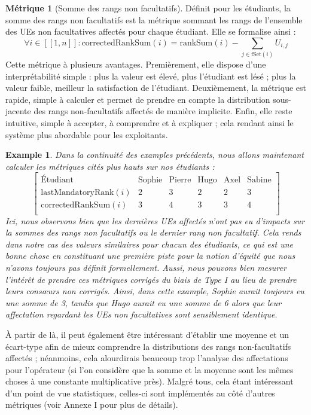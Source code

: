 \documentclass{rapport}
\theoremstyle{definition}
\theoremstyle{remark}
\theoremstyle{plain}
\newtheorem{example}{Example}
\theoremstyle{definition}
\newtheorem*{metric}{Métrique}
\theoremstyle{remark}
\newcommand{\llbracket}{[\![}
\newcommand{\rrbracket}{]\!]}
\begin{document}
\begin{metric}[Somme des rangs non facultatifs]
    Définit pour les étudiants, la somme des rangs non facultatifs est la métrique sommant les rangs de l'ensemble des UEs non facultatives affectés pour chaque étudiant. 
    Elle se formalise ainsi :
    $$
        \forall i\in\llbracket 1, n\rrbracket : \text{correctedRankSum}(i) = \text{rankSum}(i)-\sum_{j\in\text{fSet}(i)} U_{i,j}
    $$
    Cette métrique à plusieurs avantages.
    Premièrement, elle dispose d'une interprétabilité simple : plus la valeur est élevé, plus l'étudiant est lésé ; plus la valeur faible, meilleur la satisfaction de l'étudiant. 
    Deuxièmement, la métrique est rapide, simple à calculer et permet de prendre en compte la distribution sous-jacente des rangs non-facultatifs affectés de manière implicite. 
    Enfin, elle reste intuitive, simple à accepter, à comprendre et à expliquer ; cela rendant ainsi le système plus abordable pour les exploitants.
\end{metric}

\begin{example}\label{ex:running3}
    Dans la continuité des examples précédents, nous allons maintenant calculer les métriques cités plus hauts sur nos étudiants :
    $$
    \begin{bmatrix}
        \text{Étudiant} & \text{Sophie} & \text{Pierre} & \text{Hugo} & \text{Axel} & \text{Sabine}\\
        \text{lastMandatoryRank}(i) & 2 & 3 & 2 & 2 & 3\\
        \text{correctedRankSum}(i) & 3 & 4 & 3 & 3 & 4\\
    \end{bmatrix}
    $$
    Ici, nous observons bien que les dernières UEs affectés n'ont pas eu d'impacts sur la sommes des rangs non facultatifs ou le dernier rang non facultatif. Cela rends dans notre cas des valeurs similaires pour chacun des étudiants, ce qui est une bonne chose en constituant une première piste pour la notion d'équité que nous n'avons toujours pas définit formellement.
    Aussi, nous pouvons bien mesurer l'intérêt de prendre ces métriques corrigés du biais de Type I au lieu de prendre leurs consœurs non corrigés. Ainsi, dans cette example, Sophie aurait toujours eu une somme de 3, tandis que Hugo aurait eu une somme de 6 alors que leur affectation regardant les UEs non facultatives sont sensiblement identique.   
\end{example}

À partir de là, il peut également être intéressant d'établir une moyenne et un écart-type afin de mieux comprendre la distributions des rangs non-facultatifs affectés ; néanmoins, cela alourdirais beaucoup trop l'analyse des affectations pour l'opérateur (si l'on considère que la somme et la moyenne sont les mêmes choses à une constante multiplicative près). Malgré tous, cela étant intéressant d'un point de vue statistiques, celles-ci sont implémentés au côté d'autres métriques (voir Annexe I pour plus de détails). 
\end{document}
